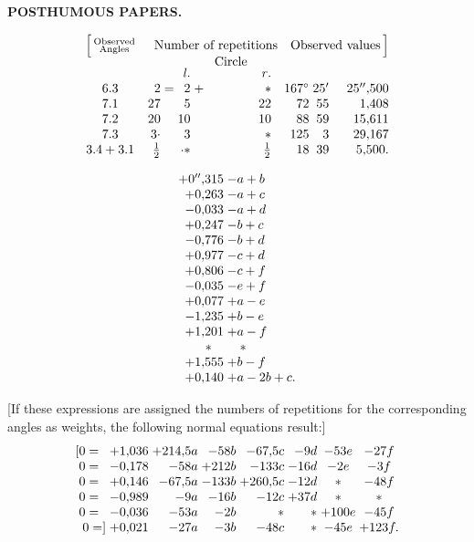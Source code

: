 \par\clearpage
\noindent{}\hfill{\small\textbf{POSTHUMOUS PAPERS.}}\hfill\null\par\medskip
{\small
\[
\begin{array}{@{}c@{\quad}r@{\;}c@{\;}r@{\;}c@{\;}r@{\quad}r@{\;}r@{\;}r@{}}
 \Bigl[\,\substack{\text{Observed}\\\text{Angles}}&
 \multicolumn{5}{c}{\text{Number of repetitions}}&
 \multicolumn{3}{c@{}}{\text{Observed values}\,\Bigr]}\\[-2pt]
 &&&\multicolumn{3}{c}{\text{Circle}}&&&\\[-3pt]
 &&&\mathit{l.}&&\mathit{r.}&&&\\
 6.3&2&=&2&+&\ast&167^\circ&25'&25''{,}500\\
 7.1&27&&5&&22&72&55&1{,}408\\
 7.2&20&&10&&10&88&59&15{,}611\\
 7.3&3\mathord{\cdot}&&3&&\ast&125&3&29{,}167\\
 3.4+3.1&\frac12&&\mathord{\raisebox{.4ex}{.}}\ast&&\frac12&18&39&5{,}500.
\end{array}
\]
}

{\par}
\[
\begin{array}{@{}r@{\;}l@{}}
 +0''{,}315&-a+b\\
 +0{,}263&-a+c\\
 -0{,}033&-a+d\\
 +0{,}247&-b+c\\
 -0{,}776&-b+d\\
 +0{,}977&-c+d\\
 +0{,}806&-c+f\\
 -0{,}035&-e+f\\
 +0{,}077&+a-e\\
 -1{,}235&+b-e\\
 +1{,}201&+a-f\\
 \makebox[2.4em][c]{\(\ast\)}&\quad\ast\\
 +1{,}555&+b-f\\
 +0{,}140&+a-2b+c.
\end{array}
\]

[If these expressions are assigned the numbers of repetitions for the corresponding angles as weights, the following normal equations result:]
\[
\begin{array}{@{}r@{\;}r@{\;}r@{\;}r@{\;}r@{\;}r@{\;}c@{\;}c@{}}
 [0=\phantom{]}&+1{,}036&+214{,}5a&-58b&-67{,}5c&-9d&-53e&-27f\\
 0=\phantom{]}&-0{,}178&-58a&+212b&-133c&-16d&-2e&-3f\\
 0=\phantom{]}&+0{,}146&-67{,}5a&-133b&+260{,}5c&-12d&\ast&-48f\\
 0=\phantom{]}&-0{,}989&-9a&-16b&-12c&+37d&\ast&\ast\\
 0=\phantom{]}&-0{,}036&-53a&-2b&\ast&\ast&+100e&-45f\\
 0=]&+0{,}021&-27a&-3b&-48c&\ast&-45e&+123f.
\end{array}
\]

